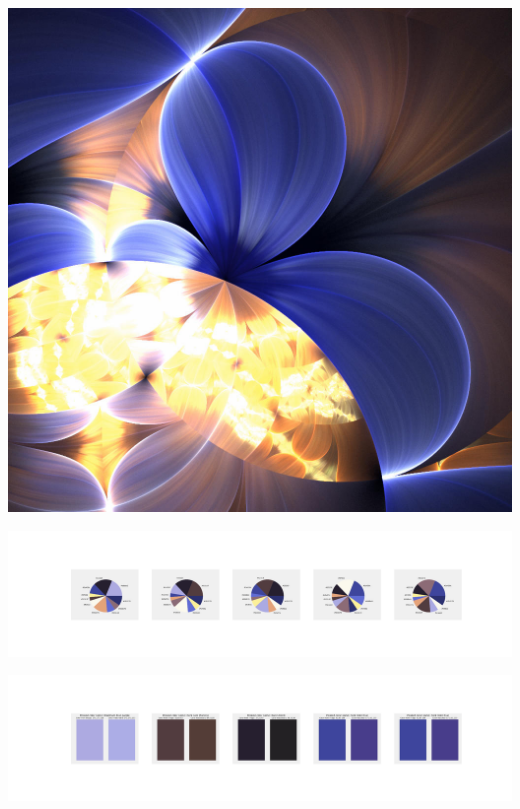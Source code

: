 \documentclass[11pt]{article}
\begin{document}
\begin{landscape}
    \begin{center}
    \includegraphics[width=\textwidth]{./nbimg/file (104).jpg}
    \end{center}

    \begin{center}
    \includegraphics[width=250mm]{./nbimg/pie-6.jpg}
    \end{center}

    \begin{center}
    \includegraphics[width=250mm]{./nbimg/peak-6.jpg}
    \end{center}
    


\end{landscape}
\end{document}

